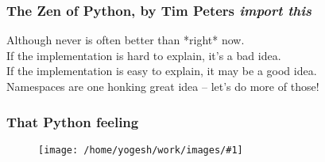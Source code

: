 \documentclass{beamer}
\newcommand{\bfr}{\begin{frame}}
\newcommand{\ft}[1]{\frametitle{#1}}
\newcommand{\myfig}[1]{\begin{figure} \texttt{[image: /home/yogesh/work/images/\#1]} \end{figure}}
\begin{document}
\bfr
\ft{The Zen of Python, by Tim Peters {\it import this}}
Although never is often better than *right* now.\\
If the implementation is hard to explain, it's a bad idea.\\
If the implementation is easy to explain, it may be a good idea.\\
Namespaces are one honking great idea -- let's do more of those!\\
\end{frame}

\bfr
\ft{That Python feeling}
\myfig{pythonflying.png}
\end{frame}
\end{document}
